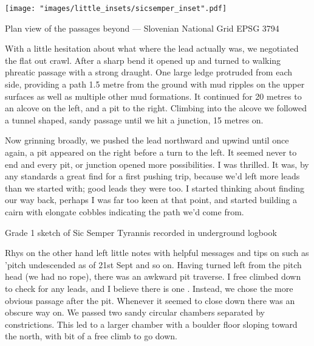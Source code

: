 \begin{marginsurvey}
	\texttt{[image: "images/little\_insets/sicsemper\_inset".pdf]}
	\caption[Sic Semper Tyrannis]{Plan view of the \protect{} passages beyond \protect{} --- Slovenian National Grid EPSG 3794}
\end{marginsurvey}


With a little hesitation about what where the lead actually was, we negotiated the flat out crawl. After a sharp bend it opened up and turned to walking phreatic passage with a strong draught. One large ledge protruded from each side, providing a path 1.5 metre from the ground with mud ripples on the upper surfaces as well as multiple other mud formations. It continued for 20 metres to an alcove on the left, and a pit to the right. Climbing into the alcove we followed a tunnel shaped, sandy passage until we hit a junction, 15 metres on. 

Now grinning broadly, we pushed the lead northward and upwind until once again, a pit appeared on the right before a turn to the left. It seemed never to end and every pit, or junction opened more possibilities. I was thrilled. It was, by any standards a great find for a first pushing trip, because we'd left more leads than we started with; good leads they were too. I started thinking about finding our way back, perhaps I was far too keen at that point, and started building a cairn with elongate cobbles indicating the path we'd come from. 

\begin{survey}[t!]
\checkoddpage \ifoddpage \forcerectofloat \else \forceversofloat \fi
\centering
{}
\caption[Sic Semper Tyrannis (grade 1)]{Grade 1 sketch of Sic Semper Tyrannis recorded in underground logbook }
\label{G1 sketch}
\end{survey}

Rhys on the other hand left little notes with helpful messages and tips on such as 'pitch undescended as of 21st Sept and so on. Having turned left from the pitch head (we had no rope), there was an awkward pit traverse. I free climbed down to check for any leads, and I believe there is one \sidenote. Instead, we chose the more obvious passage after the pit. Whenever it seemed to close down there was an obscure way on. We passed two sandy circular chambers separated by constrictions. This led to a larger chamber with a boulder floor sloping toward the north, with bit of a free climb to go down. 

